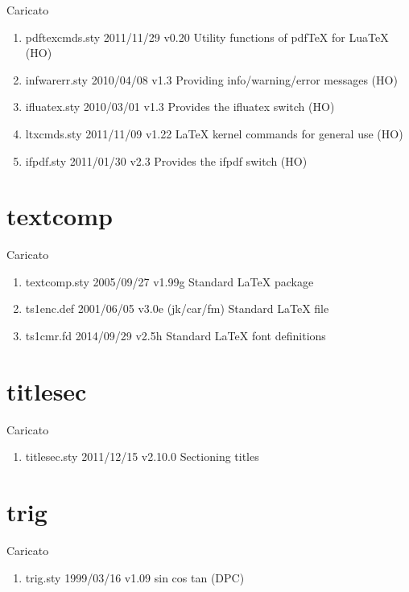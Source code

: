Caricato 
\begin{enumerate}
\item pdftexcmds.sty 2011/11/29 v0.20 Utility functions of pdfTeX for LuaTeX (HO)
\item infwarerr.sty 2010/04/08 v1.3 Providing info/warning/error messages (HO)
\item ifluatex.sty 2010/03/01 v1.3 Provides the ifluatex switch (HO)
\item ltxcmds.sty 2011/11/09 v1.22 LaTeX kernel commands for general use (HO)
\item ifpdf.sty 2011/01/30 v2.3 Provides the ifpdf switch (HO)
\end{enumerate} 
\section{textcomp}  

Caricato 
\begin{enumerate}
\item textcomp.sty 2005/09/27 v1.99g Standard LaTeX package
\item ts1enc.def 2001/06/05 v3.0e (jk/car/fm) Standard LaTeX file
\item ts1cmr.fd 2014/09/29 v2.5h Standard LaTeX font definitions
\end{enumerate} 
\section{titlesec}  

Caricato 
\begin{enumerate}
 \item titlesec.sty 2011/12/15 v2.10.0 Sectioning titles
\end{enumerate} 
\section{trig}  

Caricato 
\begin{enumerate}
\item trig.sty 1999/03/16 v1.09 sin cos tan (DPC)
\end{enumerate} 

